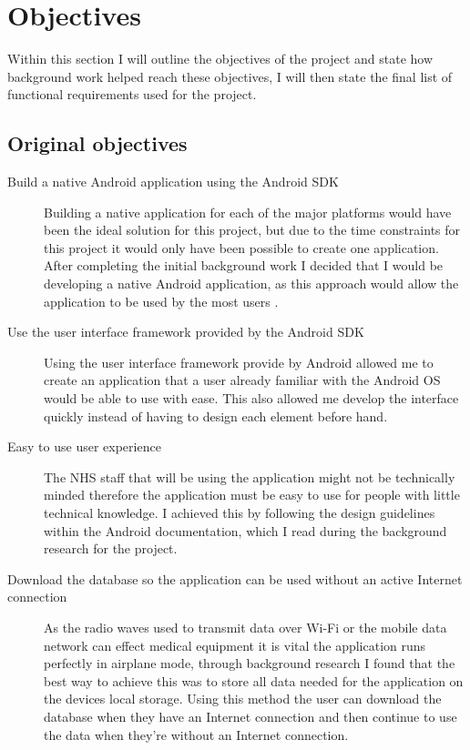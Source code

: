 \section{Objectives}

Within this section I will outline the objectives of the project and state how background work helped reach these objectives, I will then state the final list of functional requirements used for the project.

\subsection{Original objectives}

\begin{description}
	\item[Build a native Android application using the Android SDK]  Building a native application for each of the major platforms would have been the ideal solution for this project, but due to the time constraints for this project it would only have been possible to create one application. After completing the initial background work I decided that I would be developing a native Android \cite{android} application, as this approach would allow the application to be used by the most users \cite{phone_market}.
	\item[Use the user interface framework provided by the Android SDK] Using the user interface framework provide by Android allowed me to create an application that a user already familiar with the Android OS would be able to use with ease. This also allowed me develop the interface quickly instead of having to design each element before hand.
	\item[Easy to use user experience]  The NHS staff that will be using the application might not be technically minded therefore the application must be easy to use for people with little technical knowledge. I achieved this by following the design guidelines within the Android documentation, which I read during the background research for the project.
	\item[Download the database so the application can be used without an active Internet connection] As the radio waves used to transmit data over Wi-Fi or the mobile data network can effect medical equipment \cite{mobile_inter} it is vital the application runs perfectly in airplane mode, through background research I found that the best way to achieve this was to store all data needed for the application on the devices local storage. Using this method the user can download the database when they have an Internet connection and then continue to use the data when they're without an Internet connection.

\end{description}
